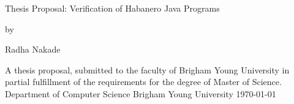 \pagestyle{empty}


\begin{center}
\begin{Huge}
Thesis Proposal:
\linebreak
Verification of Habanero Java Programs
\linebreak
\end{Huge}

by \linebreak \linebreak \linebreak \linebreak

\begin{huge}
Radha Nakade
\linebreak 
\linebreak 
\linebreak 
\linebreak 
\end{huge}

\begin{large}

A thesis proposal, submitted to the faculty of Brigham Young University in
partial fulfillment of the requirements for the degree of Master of Science.
\linebreak 
\linebreak 
\linebreak 
\linebreak 
Department of
Computer Science 
\linebreak 
\linebreak 
Brigham Young University
\linebreak 
\linebreak 
\today
\linebreak 
\linebreak

\end{large}


\end{center}
\pagebreak
